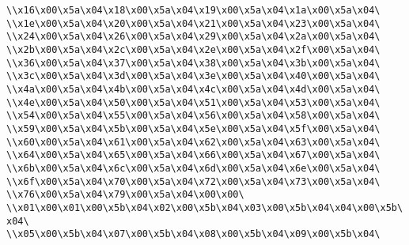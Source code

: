 \verb|\\x16\x00\x5a\x04\x18\x00\x5a\x04\x19\x00\x5a\x04\x1a\x00\x5a\x04\|\newline
\verb|\\x1e\x00\x5a\x04\x20\x00\x5a\x04\x21\x00\x5a\x04\x23\x00\x5a\x04\|\newline
\verb|\\x24\x00\x5a\x04\x26\x00\x5a\x04\x29\x00\x5a\x04\x2a\x00\x5a\x04\|\newline
\verb|\\x2b\x00\x5a\x04\x2c\x00\x5a\x04\x2e\x00\x5a\x04\x2f\x00\x5a\x04\|\newline
\verb|\\x36\x00\x5a\x04\x37\x00\x5a\x04\x38\x00\x5a\x04\x3b\x00\x5a\x04\|\newline
\verb|\\x3c\x00\x5a\x04\x3d\x00\x5a\x04\x3e\x00\x5a\x04\x40\x00\x5a\x04\|\newline
\verb|\\x4a\x00\x5a\x04\x4b\x00\x5a\x04\x4c\x00\x5a\x04\x4d\x00\x5a\x04\|\newline
\verb|\\x4e\x00\x5a\x04\x50\x00\x5a\x04\x51\x00\x5a\x04\x53\x00\x5a\x04\|\newline
\verb|\\x54\x00\x5a\x04\x55\x00\x5a\x04\x56\x00\x5a\x04\x58\x00\x5a\x04\|\newline
\verb|\\x59\x00\x5a\x04\x5b\x00\x5a\x04\x5e\x00\x5a\x04\x5f\x00\x5a\x04\|\newline
\verb|\\x60\x00\x5a\x04\x61\x00\x5a\x04\x62\x00\x5a\x04\x63\x00\x5a\x04\|\newline
\verb|\\x64\x00\x5a\x04\x65\x00\x5a\x04\x66\x00\x5a\x04\x67\x00\x5a\x04\|\newline
\verb|\\x6b\x00\x5a\x04\x6c\x00\x5a\x04\x6d\x00\x5a\x04\x6e\x00\x5a\x04\|\newline
\verb|\\x6f\x00\x5a\x04\x70\x00\x5a\x04\x72\x00\x5a\x04\x73\x00\x5a\x04\|\newline
\verb|\\x76\x00\x5a\x04\x79\x00\x5a\x04\x00\x00\|\newline
\verb|\\x01\x00\x01\x00\x5b\x04\x02\x00\x5b\x04\x03\x00\x5b\x04\x04\x00\x5b\x04\|\newline
\verb|\\x05\x00\x5b\x04\x07\x00\x5b\x04\x08\x00\x5b\x04\x09\x00\x5b\x04\|\newline

